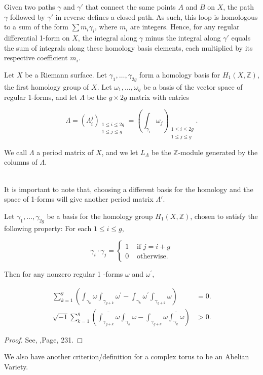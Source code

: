 Given two paths \( \gamma \) and \( \gamma' \) that connect the same points \( A \) and \( B \) on \( X \), the path \( \gamma \) followed by \( \gamma' \) in reverse defines a closed path. As such, this loop is homologous to a sum of the form \( \sum m_i \gamma_i \), where \( m_i \) are integers. Hence, for any regular differential 1-form on \( X \), the integral along \( \gamma \) minus the integral along \( \gamma' \) equals the sum of integrals along these homology basis elements, each multiplied by its respective coefficient \( m_i \).

\begin{definition}
Let $X$ be a Riemann surface. Let \( \gamma_1, \ldots, \gamma_{2g} \) form a homology basis for \( H_1(X, \mathbb{Z}) \), the first homology group of \( X \). Let $\omega_{1}, \ldots, \omega_{g}$ be a basis of the vector space of regular 1-forms, and let $\Lambda$ be the $g \times 2 g$ matrix with entries

$$
\Lambda=\left(\Lambda_{i}^{j}\right)_{\substack{1 \leq i \leq 2 g \\ 1 \leq j \leq g}}=\left(\int_{\gamma_{i}} \omega_{j}\right)_{\substack{1 \leq i \leq 2 g \\ 1 \leq j \leq g}} .
$$

We call $\Lambda$ a period matrix of $X$, and we let $L_{\Lambda}$ be the $\mathbb{Z}$-module generated by the columns of $\Lambda$. 
\end{definition}\\

It is important to note that, choosing a different basis for the homology and the space of 1-forms will give another period matrix $\Lambda'$.
\begin{theorem}
Let $\gamma_{1}, \ldots, \gamma_{2 g}$ be a basis for the homology group $H_{1}(X, \mathbb{Z})$, chosen to satisfy the following property: For each $1 \leq i \leq g$,

$$
\gamma_{i} \cdot \gamma_{j}= \begin{cases}1 & \text { if } j=i+g \\ 0 & \text { otherwise. }\end{cases}
$$

Then for any nonzero regular 1 -forms $\omega$ and $\omega^{\prime}$,

$$
\begin{aligned}
\sum_{k=1}^{g}\left(\int_{\gamma_{k}} \omega \int_{\gamma_{g+k}} \omega^{\prime}-\int_{\gamma_{k}} \omega^{\prime} \int_{\gamma_{g+k}} \omega\right) & =0 . \\
\sqrt{-1} \sum_{k=1}^{g}\left(\overline{\int_{\gamma_{g+k}} \omega} \int_{\gamma_{k}} \omega-\int_{\gamma_{g+k}} \omega \overline{\int_{\gamma_{k}} \omega}\right) & >0 .
\end{aligned}
$$

    \begin{proof}
        See, \cite{griffiths2014principles},Page, 231. 
    \end{proof}
\end{theorem}
We also have another criterion/definition for a complex torus to be an Abelian Variety. 

